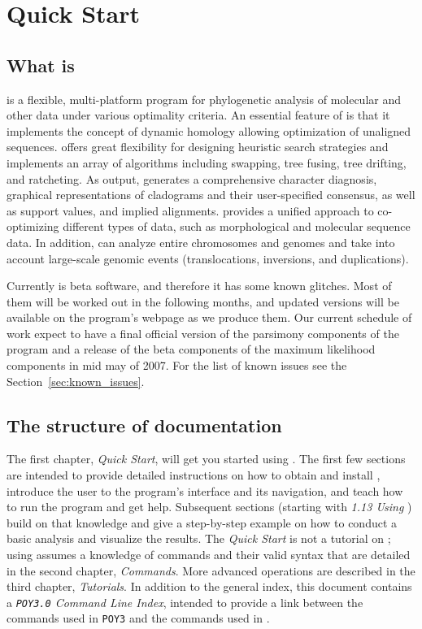 \chapter{\poy Quick Start}

\section{What is \poy}

\poy is a flexible, multi-platform program for phylogenetic analysis of molecular and other data under various optimality criteria. An essential feature of \poy is that it implements the concept of dynamic homology allowing optimization of unaligned sequences. \poy offers great flexibility for designing heuristic search strategies and implements an array of algorithms including swapping, tree fusing, tree drifting, and ratcheting. As output, \poy generates a comprehensive character diagnosis, graphical representations of cladograms and their user-specified consensus, as well as support values, and implied alignments. \poy provides a unified approach to co-optimizing different types of data, such as morphological and molecular sequence data. In addition, \poy can analyze entire chromosomes and genomes and take into account large-scale genomic events (translocations, inversions, and duplications).

Currently \poy is beta software, and therefore it has some known glitches. Most
of them will be worked out in the following months, and updated versions will be
available on the program's webpage as we produce them. Our current schedule of
work expect to have a final official version of the parsimony components of the
program and a release of the beta components of the maximum
likelihood components in mid may of 2007. For the list of known issues see the
Section~\ref{sec:known_issues}.

\section{The structure of \poy documentation}
The first chapter, \emph{\poy Quick Start}, will get you started using \poy. The first few sections are intended to provide detailed instructions on how to obtain and install \poy, introduce the user to the program's interface and its navigation, and teach how to run the program and get help. Subsequent sections (starting with \emph{1.13 Using \poy}) build on that knowledge and give a step-by-step example on how to conduct a basic analysis and visualize the results. The \emph{\poy Quick Start} is not a tutorial on \poy; using \poy assumes a knowledge of \poy commands and their valid syntax that are detailed in the second chapter, \emph{\poy Commands}. More advanced operations are described in the third chapter, \emph{\poy Tutorials}. In addition to the general index, this document contains a \emph{\texttt{POY3.0} Command Line Index}, intended to provide a link between the commands used in \texttt{POY3} and the commands used in \poy. 

